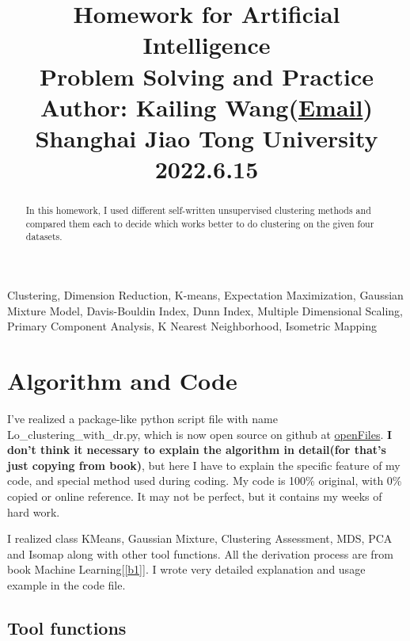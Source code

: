 \documentclass[conference]{IEEEtran}
\begin{document}
\title{Homework for Artificial Intelligence \\ Problem Solving and Practice \\
{\normalsize \vspace{1em} Author: Kailing Wang(\href{mailto:wangkailing151@gmail.com}{Email}) \\ Shanghai Jiao Tong University \\ 2022.6.15}
}

\maketitle

\begin{abstract}
In this homework, I used different self-written unsupervised clustering methods and compared them each to decide which works better to do clustering on the given four datasets.
\end{abstract}

\begin{IEEEkeywords}
Clustering, Dimension Reduction, K-means, Expectation Maximization, Gaussian Mixture Model, Davis-Bouldin Index, Dunn Index, Multiple Dimensional Scaling, Primary Component Analysis, K Nearest Neighborhood, Isometric Mapping
\end{IEEEkeywords}

\section{\textbf{Algorithm and Code}}
I've realized a package-like python script file with name Lo\_clustering\_with\_dr.py, which is now open source on github at \href{https://github.com/Loping151/openFiles/tree/main/2022Spring/AIHomework}{openFiles}. \textbf{I don't think it necessary to explain the algorithm in detail(for that's just copying from book)}, but here I have to explain the specific feature of my code, and special method used during coding. My code is 100\% original, with 0\% copied or online reference. It may not be perfect, but it contains my weeks of hard work.

I realized class KMeans, Gaussian Mixture, Clustering Assessment, MDS, PCA and Isomap along with other tool functions. All the derivation process are from book Machine Learning[\ref{b1}]. I wrote very detailed explanation and usage example in the code file.

\subsection{\textbf{Tool functions}}
\end{document}
